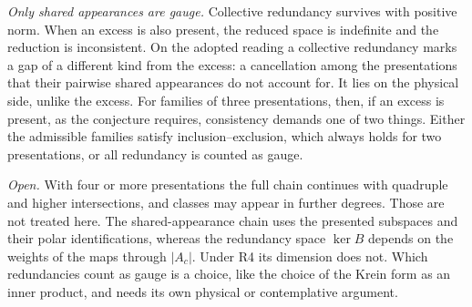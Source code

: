 \documentclass[11pt]{article}
\theoremstyle{remark}
\begin{document}
\emph{Only shared appearances are gauge.} Collective redundancy survives with positive norm. When an excess is also present, the reduced space is indefinite and the reduction is inconsistent. On the adopted reading a collective redundancy marks a gap of a different kind from the excess: a cancellation among the presentations that their pairwise shared appearances do not account for. It lies on the physical side, unlike the excess. For families of three presentations, then, if an excess is present, as the conjecture requires, consistency demands one of two things. Either the admissible families satisfy inclusion--exclusion, which always holds for two presentations, or all redundancy is counted as gauge.

\emph{Open.} With four or more presentations the full chain continues with quadruple and higher intersections, and classes may appear in further degrees. Those are not treated here. The shared-appearance chain uses the presented subspaces and their polar identifications, whereas the redundancy space $\ker B$ depends on the weights of the maps through $|A_c|$. Under R4 its dimension does not. Which redundancies count as gauge is a choice, like the choice of the Krein form as an inner product, and needs its own physical or contemplative argument.
\end{document}
